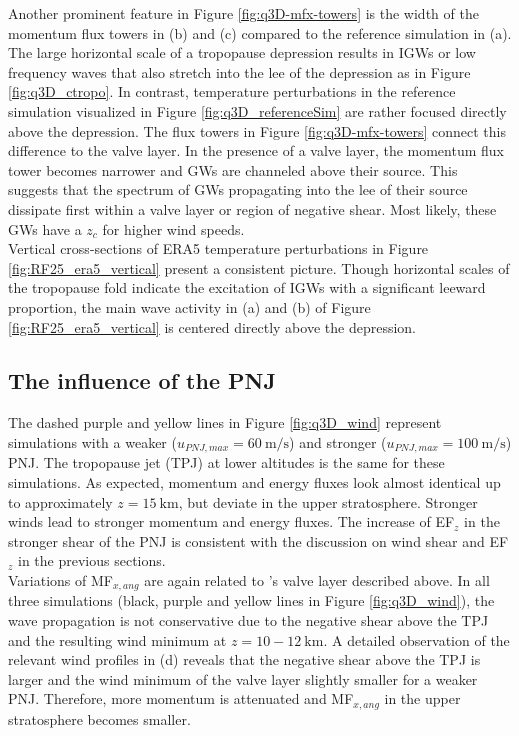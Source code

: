 Another prominent feature in Figure \ref{fig:q3D-mfx-towers} is the width of the momentum flux towers in (b) and (c) compared to the reference simulation in (a). The large horizontal scale of a tropopause depression results in IGWs or low frequency waves that also stretch into the lee of the depression as in Figure \ref{fig:q3D_ctropo}. In contrast, temperature perturbations in the reference simulation visualized in Figure \ref{fig:q3D_referenceSim} are rather focused directly above the depression. The flux towers in Figure \ref{fig:q3D-mfx-towers} connect this difference to the valve layer. In the presence of a valve layer, the momentum flux tower becomes narrower and GWs are channeled above their source. This suggests that the spectrum of GWs propagating into the lee of their source dissipate first within a valve layer or region of negative shear. Most likely, these GWs have a $z_c$ for higher wind speeds.\\
Vertical cross-sections of ERA5 temperature perturbations in Figure \ref{fig:RF25_era5_vertical} present a consistent picture. Though horizontal scales of the tropopause fold indicate the excitation of IGWs with a significant leeward proportion, the main wave activity in (a) and (b) of Figure \ref{fig:RF25_era5_vertical} is centered directly above the depression.


\subsection*{The influence of the PNJ}
The dashed purple and yellow lines in Figure \ref{fig:q3D_wind} represent simulations with a weaker ($u_{PNJ,max}=\SI{60}{\meter\per\second}$) and stronger ($u_{PNJ,max}=\SI{100}{\meter\per\second}$) PNJ. The tropopause jet (TPJ) at lower altitudes is the same for these simulations. As expected, momentum and energy fluxes look almost identical up to approximately $z=\SI{15}{\kilo\meter}$, but deviate in the upper stratosphere. Stronger winds lead to stronger momentum and energy fluxes. The increase of EF$_z$ in the stronger shear of the PNJ is consistent with the discussion on wind shear and EF$_z$ in the previous sections.\\
Variations of MF$_{x,ang}$ are again related to \textcite[]{kruse_midlatitude_2016}'s valve layer described above. In all three simulations (black, purple and yellow lines in Figure \ref{fig:q3D_wind}), the wave propagation is not conservative due to the negative shear above the TPJ and the resulting wind minimum at $z=10-\SI{12}{\kilo\meter}$. A detailed observation of the relevant wind profiles in (d) reveals that the negative shear above the TPJ is larger and the wind minimum of the valve layer slightly smaller for a weaker PNJ. Therefore, more momentum is attenuated and MF$_{x,ang}$ in the upper stratosphere becomes smaller.


